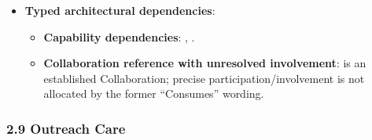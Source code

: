 \begin{itemize}
\begin{itemize}
\begin{itemize}
\item 
\emph{Exposed Service}: \texttt{} — Exposes community provider contact rosters.



\end{itemize}


\end{itemize}


\item 
\textbf{Typed architectural dependencies}:


\begin{itemize}

\item 
\textbf{Capability dependencies}: \texttt{}, \texttt{}.



\item 
\textbf{Collaboration reference with unresolved involvement}: \texttt{} is an established Collaboration; precise participation/\allowbreak{}involvement is not allocated by the former “Consumes” wording.



\end{itemize}


\end{itemize}
\label{rad:sd:197}

\par\smallskip
{}\label{rad:sd:199}



\label{rad:sd:201}
\subsubsection*{2.9 Outreach Care}
\label{rad:sd:202}

